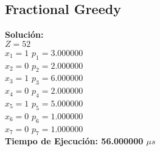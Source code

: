 \documentclass[12pt]{article}
\newcommand\tab[1][1cm]{\hspace*{#1}}
\begin{document}
\subsection*{Fractional Greedy}
\textbf{Soluci\'on:}\\
\tab $Z = 52$\\
\tab$x_{1} = 1$ \tab$p_{1} = 3.000000$\\
\tab$x_{2} = 0$ \tab$p_{2} = 2.000000$\\
\tab$x_{3} = 1$ \tab$p_{3} = 6.000000$\\
\tab$x_{4} = 0$ \tab$p_{4} = 2.000000$\\
\tab$x_{5} = 1$ \tab$p_{5} = 5.000000$\\
\tab$x_{6} = 0$ \tab$p_{6} = 1.000000$\\
\tab$x_{7} = 0$ \tab$p_{7} = 1.000000$\\
\textbf{Tiempo de Ejecuci\'on: 56.000000 $\mu s$} \\
\end{document}
